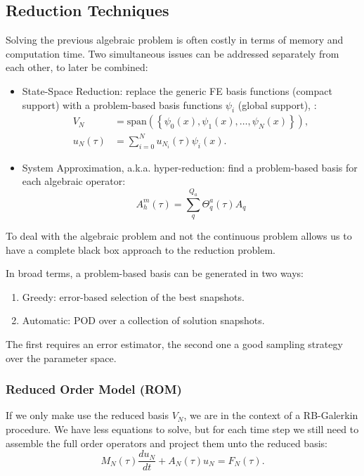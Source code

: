 \documentclass[../main.tex]{subfiles}
\begin{document}
\subsection{Reduction Techniques}
Solving the previous algebraic problem is often costly in terms of memory and computation time.
Two simultaneous issues can be addressed separately from each other, to later be combined:
\begin{itemize}
    \item State-Space Reduction: replace the generic FE basis functions (compact support) with a problem-based basis functions $\psi_i$ (global support), :
    \begin{align*}
        V_N &= \text{span}(\left\{\psi_0(x), \psi_1(x), \ldots, \psi_{N}(x)\right\}), \\
        u_N \left(\tau\right) &= \sum^{N}_{i=0} u_{N_{i}} \left(\tau\right) \psi_i (x).
    \end{align*}
    \item System Approximation, a.k.a. hyper-reduction: find a problem-based basis for each algebraic operator:
    \begin{equation}
        A_h^m(\tau) = \sum_{q}^{Q_a} \Theta_{q}^{a}(\tau) A_q
    \end{equation}
\end{itemize}
To deal with the algebraic problem and not the continuous problem allows us to have a complete black box approach to the reduction problem.

In broad terms, a problem-based basis can be generated in two ways:
\begin{enumerate}
    \item Greedy: error-based selection of the best snapshots.
    \item Automatic: POD over a collection of solution snapshots.
\end{enumerate}
The first requires an error estimator, the second one a good sampling strategy over the parameter space. 

\subsubsection{Reduced Order Model (ROM)}
If we only make use the reduced basis $V_N$, we are in the context of a RB-Galerkin procedure. 
We have less equations to solve, but for each time step we still need to assemble the full order operators and project them unto the reduced basis:
\begin{equation}
    M_N (\tau) \frac{d u_N}{dt} + A_N (\tau) u_N  = F_N(\tau).
\end{equation}
\end{document}
